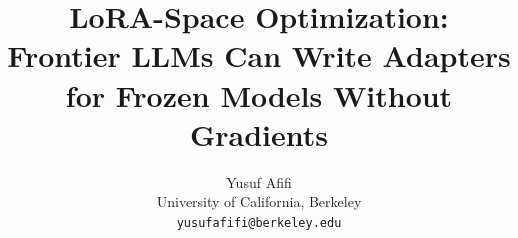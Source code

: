 \documentclass[11pt]{article}
\title{LoRA-Space Optimization:\\Frontier LLMs Can Write Adapters for Frozen Models Without Gradients}
\author{
  Yusuf Afifi\\
  University of California, Berkeley\\
  \texttt{yusufafifi@berkeley.edu}
}
\date{}
\begin{document}
\maketitle

\begin{abstract}

\end{abstract}













\appendix



\end{document}
